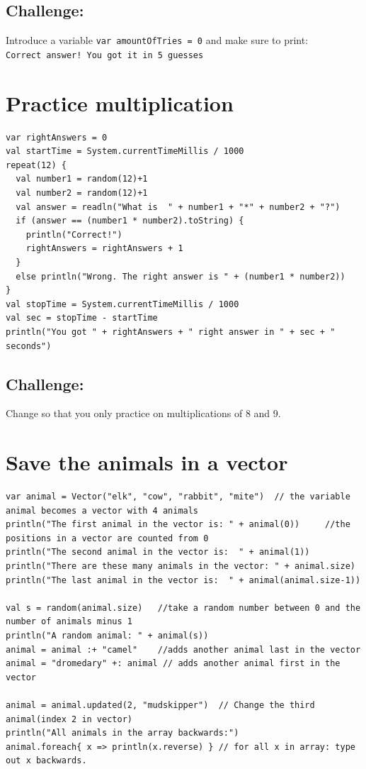 \section*{\color{BrickRed}Challenge:}
Introduce a variable \lstinline{var amountOfTries = 0} and make sure to print:\\
\lstinline{Correct answer! You got it in 5 guesses}
\chapter{Practice multiplication}
\begin{lstlisting}[basicstyle={\ttfamily\fontsize{16}{19}\selectfont},numbers=none]
var rightAnswers = 0
val startTime = System.currentTimeMillis / 1000
repeat(12) {
  val number1 = random(12)+1
  val number2 = random(12)+1
  val answer = readln("What is  " + number1 + "*" + number2 + "?")
  if (answer == (number1 * number2).toString) {
    println("Correct!")
    rightAnswers = rightAnswers + 1
  }
  else println("Wrong. The right answer is " + (number1 * number2))
}
val stopTime = System.currentTimeMillis / 1000
val sec = stopTime - startTime
println("You got " + rightAnswers + " right answer in " + sec + " seconds")
\end{lstlisting}
        
\section*{\color{BrickRed}Challenge:}
Change so that you only practice on multiplications of 8 and 9.
\chapter{Save the animals in a vector}
\begin{lstlisting}[basicstyle={\ttfamily\fontsize{14}{17}\selectfont},numbers=none]
var animal = Vector("elk", "cow", "rabbit", "mite")  // the variable animal becomes a vector with 4 animals
println("The first animal in the vector is: " + animal(0))     //the positions in a vector are counted from 0
println("The second animal in the vector is:  " + animal(1))
println("There are these many animals in the vector: " + animal.size)
println("The last animal in the vector is:  " + animal(animal.size-1))

val s = random(animal.size)   //take a random number between 0 and the number of animals minus 1
println("A random animal: " + animal(s))
animal = animal :+ "camel"    //adds another animal last in the vector
animal = "dromedary" +: animal // adds another animal first in the vector

animal = animal.updated(2, "mudskipper")  // Change the third animal(index 2 in vector)
println("All animals in the array backwards:")
animal.foreach{ x => println(x.reverse) } // for all x in array: type out x backwards.
\end{lstlisting}
        
